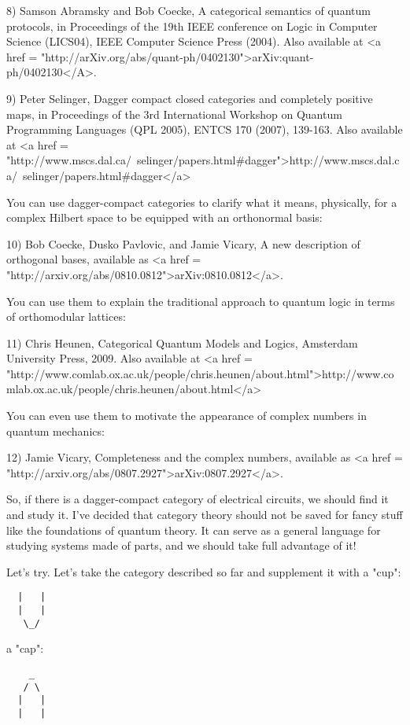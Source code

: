 8) Samson Abramsky and Bob Coecke, A categorical semantics of quantum
protocols, in Proceedings of the 19th IEEE conference on Logic in
Computer Science (LICS04), IEEE Computer Science Press (2004).
Also available at <a href = "http://arXiv.org/abs/quant-ph/0402130">arXiv:quant-ph/0402130</A>.

9) Peter Selinger, Dagger compact closed categories and completely
positive maps, in Proceedings of the 3rd International Workshop on
Quantum Programming Languages (QPL 2005), ENTCS 170 (2007), 139-163.
Also available at <a href = "http://www.mscs.dal.ca/~selinger/papers.html#dagger">http://www.mscs.dal.ca/~selinger/papers.html#dagger</a>

You can use dagger-compact categories to clarify what it means,
physically, for a complex Hilbert space to be equipped with an
orthonormal basis:

10) Bob Coecke, Dusko Pavlovic, and Jamie Vicary, A new description of
orthogonal bases, available as
<a href = "http://arxiv.org/abs/0810.0812">arXiv:0810.0812</a>.

You can use them to explain the traditional approach to quantum logic
in terms of orthomodular lattices:

11) Chris Heunen, Categorical Quantum Models and Logics, Amsterdam
University Press, 2009.  Also available at  
<a href = "http://www.comlab.ox.ac.uk/people/chris.heunen/about.html">http://www.comlab.ox.ac.uk/people/chris.heunen/about.html</a>

You can even use them to motivate the appearance of complex
numbers in quantum mechanics:

12) Jamie Vicary, Completeness and the complex numbers, available as
<a href = "http://arxiv.org/abs/0807.2927">arXiv:0807.2927</a>.

So, if there is a dagger-compact category of electrical circuits, we
should find it and study it.  I've decided that category theory should
not be saved for fancy stuff like the foundations of quantum theory.  
It can serve as a general language for studying systems made of parts,
and we should take full advantage of it!

Let's try.  Let's take the category described so far and supplement it
with a "cup":

\begin{verbatim}
  |   |
  |   |
   \_/
\end{verbatim}
    
a "cap":
\begin{verbatim}
    _
   / \
  |   |
  |   |
\end{verbatim}
    
